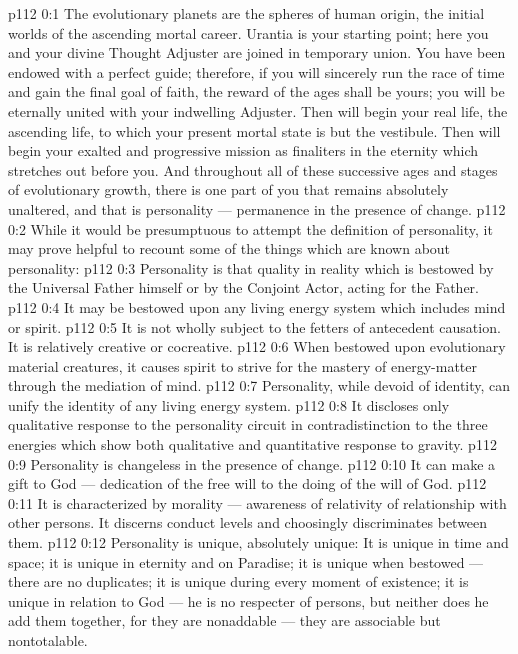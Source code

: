 \author{Solitary Messenger}
\vs p112 0:1 The evolutionary planets are the spheres of human origin, the initial worlds of the ascending mortal career. Urantia is your starting point; here you and your divine Thought Adjuster are joined in temporary union. You have been endowed with a perfect guide; therefore, if you will sincerely run the race of time and gain the final goal of faith, the reward of the ages shall be yours; you will be eternally united with your indwelling Adjuster. Then will begin your real life, the ascending life, to which your present mortal state is but the vestibule. Then will begin your exalted and progressive mission as finaliters in the eternity which stretches out before you. And throughout all of these successive ages and stages of evolutionary growth, there is one part of you that remains absolutely unaltered, and that is personality --- permanence in the presence of change.
\vs p112 0:2 \pc While it would be presumptuous to attempt the definition of personality, it may prove helpful to recount some of the things which are known about personality:
\vs p112 0:3 \bibnobreakspace Personality is that quality in reality which is bestowed by the Universal Father himself or by the Conjoint Actor, acting for the Father.
\vs p112 0:4 \bibnobreakspace It may be bestowed upon any living energy system which includes mind or spirit.
\vs p112 0:5 \bibnobreakspace It is not wholly subject to the fetters of antecedent causation. It is relatively creative or cocreative.
\vs p112 0:6 \bibnobreakspace When bestowed upon evolutionary material creatures, it causes spirit to strive for the mastery of energy\hyp{}matter through the mediation of mind.
\vs p112 0:7 \bibnobreakspace Personality, while devoid of identity, can unify the identity of any living energy system.
\vs p112 0:8 \bibnobreakspace It discloses only qualitative response to the personality circuit in contradistinction to the three energies which show both qualitative and quantitative response to gravity.
\vs p112 0:9 \bibnobreakspace Personality is changeless in the presence of change.
\vs p112 0:10 \bibnobreakspace It can make a gift to God --- dedication of the free will to the doing of the will of God.
\vs p112 0:11 \bibnobreakspace It is characterized by morality --- awareness of relativity of relationship with other persons. It discerns conduct levels and choosingly discriminates between them.
\vs p112 0:12 \bibnobreakspace Personality is unique, absolutely unique: It is unique in time and space; it is unique in eternity and on Paradise; it is unique when bestowed --- there are no duplicates; it is unique during every moment of existence; it is unique in relation to God --- he is no respecter of persons, but neither does he add them together, for they are nonaddable --- they are associable but nontotalable.
